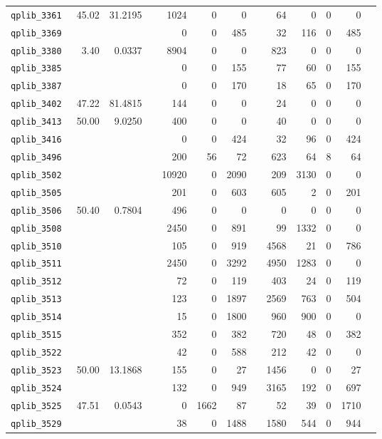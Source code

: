 \begin{longtable}{lrrrrrrrrrrrr}
{\tt 	qplib\_3361	}	&	45.02	&	31.2195	&	&	1024	&	0	&	0	&	&	64	&	0	&	0	&	0	\\
{\tt 	qplib\_3369	}	&		&		&	&	0	&	0	&	485	&	&	32	&	116	&	0	&	485	\\
{\tt 	qplib\_3380	}	&	3.40	&	0.0337	&	&	8904	&	0	&	0	&	&	823	&	0	&	0	&	0	\\
{\tt 	qplib\_3385	}	&		&		&	&	0	&	0	&	155	&	&	77	&	60	&	0	&	155	\\
{\tt 	qplib\_3387	}	&		&		&	&	0	&	0	&	170	&	&	18	&	65	&	0	&	170	\\
{\tt 	qplib\_3402	}	&	47.22	&	81.4815	&	&	144	&	0	&	0	&	&	24	&	0	&	0	&	0	\\
{\tt 	qplib\_3413	}	&	50.00	&	9.0250	&	&	400	&	0	&	0	&	&	40	&	0	&	0	&	0	\\
{\tt 	qplib\_3416	}	&		&		&	&	0	&	0	&	424	&	&	32	&	96	&	0	&	424	\\
{\tt 	qplib\_3496	}	&		&		&	&	200	&	56	&	72	&	&	623	&	64	&	8	&	64	\\
{\tt 	qplib\_3502	}	&		&		&	&	10920	&	0	&	2090	&	&	209	&	3130	&	0	&	0	\\
{\tt 	qplib\_3505	}	&		&		&	&	201	&	0	&	603	&	&	605	&	2	&	0	&	201	\\
{\tt 	qplib\_3506	}	&	50.40	&	0.7804	&	&	496	&	0	&	0	&	&	0	&	0	&	0	&	0	\\
{\tt 	qplib\_3508	}	&		&		&	&	2450	&	0	&	891	&	&	99	&	1332	&	0	&	0	\\
{\tt 	qplib\_3510	}	&		&		&	&	105	&	0	&	919	&	&	4568	&	21	&	0	&	786	\\
{\tt 	qplib\_3511	}	&		&		&	&	2450	&	0	&	3292	&	&	4950	&	1283	&	0	&	0	\\
{\tt 	qplib\_3512	}	&		&		&	&	72	&	0	&	119	&	&	403	&	24	&	0	&	119	\\
{\tt 	qplib\_3513	}	&		&		&	&	123	&	0	&	1897	&	&	2569	&	763	&	0	&	504	\\
{\tt 	qplib\_3514	}	&		&		&	&	15	&	0	&	1800	&	&	960	&	900	&	0	&	0	\\
{\tt 	qplib\_3515	}	&		&		&	&	352	&	0	&	382	&	&	720	&	48	&	0	&	382	\\
{\tt 	qplib\_3522	}	&		&		&	&	42	&	0	&	588	&	&	212	&	42	&	0	&	0	\\
{\tt 	qplib\_3523	}	&	50.00	&	13.1868	&	&	155	&	0	&	27	&	&	1456	&	0	&	0	&	27	\\
{\tt 	qplib\_3524	}	&		&		&	&	132	&	0	&	949	&	&	3165	&	192	&	0	&	697	\\
{\tt 	qplib\_3525	}	&	47.51	&	0.0543	&	&	0	&	1662	&	87	&	&	52	&	39	&	0	&	1710	\\
{\tt 	qplib\_3529	}	&		&		&	&	38	&	0	&	1488	&	&	1580	&	544	&	0	&	944	\\

\end{longtable}
